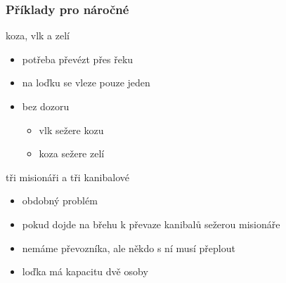 \begin{frame}
	\frametitle{Příklady pro náročné}
	\begin{block}{koza, vlk a zelí}
		\begin{itemize}
			\item{potřeba převézt přes řeku}
			\item{na loďku se vleze pouze jeden}
			\item{bez dozoru}
			\begin{itemize}
				\item{vlk sežere kozu}
				\item{koza sežere zelí}
			\end{itemize}
		\end{itemize}
	\end{block}
	\begin{block}{tři misionáři a tři kanibalové}
		\begin{itemize}
			\item{obdobný problém}
			\item{pokud dojde na břehu k převaze kanibalů sežerou misionáře}
			\item{nemáme převozníka, ale někdo s ní musí přeplout}
			\item{loďka má kapacitu dvě osoby}
		\end{itemize}
	\end{block}
\end{frame}




